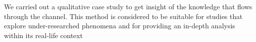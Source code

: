 \documentclass{sig-alternate-05-2015}
\begin{document}
    We carried out a qualitative case study to get insight of the knowledge that flows through the channel. 
    This method is considered to be suitable for studies that explore under-researched phenomena and for providing an in-depth analysis within its real-life context~\cite{Yin2009}







\end{document}
